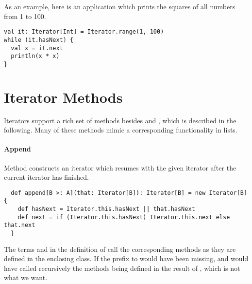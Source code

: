 {As an example, here is an application which prints the squares of all
numbers from 1 to 100.
\begin{lstlisting}
val it: Iterator[Int] = Iterator.range(1, 100)
while (it.hasNext) {
  val x = it.next
  println(x * x)
}
\end{lstlisting}

\section{Iterator Methods}

Iterators support a rich set of methods besides  and
, which is described in the following. Many of these
methods mimic a corresponding functionality in lists.

\paragraph{Append}
Method  constructs an iterator which resumes with the
given iterator  after the current iterator has finished.
\begin{lstlisting}
  def append[B >: A](that: Iterator[B]): Iterator[B] = new Iterator[B] {
    def hasNext = Iterator.this.hasNext || that.hasNext
    def next = if (Iterator.this.hasNext) Iterator.this.next else that.next
  }    
\end{lstlisting}
The terms  and 
in the definition of  call the corresponding methods as
they are defined in the enclosing  class.  If the
 prefix to  would have been missing,
 and  would have called recursively the
methods being defined in the result of , which is not
what we want.

}
